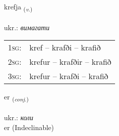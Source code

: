 \documentclass[frontgrid, backgrid]{flacards}\usepackage[]{graphicx}\usepackage[]{xcolor}
\begin{document}
\renewcommand{\flhead}{\vskip5pt \fboxsep=0pt {\small\bfseries\footnotesize Sagnorð | дієслово}}
\renewcommand{\fcfoot}{\vskip5pt \fboxsep=0pt \hspace{2pt}{\small\bfseries\footnotesize 1K}}

\renewcommand{\blhead}{\vskip5pt {\small\bfseries\footnotesize Sagnorð | дієслово }}
\renewcommand{\bcfoot}{\vskip5pt \hspace{2pt}{\small\bfseries\footnotesize 1K}}


{krefja \small{\textsubscript{(\textit{v.})}} \\[1ex] %
\textphonetic{[kʰrɛvja]} \\
ukr.: \emph{вимагати} \\  [2ex]
\renewcommand*{\arraystretch}{0.8}
\begin{tabular}{p{1cm}l}
\textsc{1sg}: & kref -- krafði -- krafið \\ 
\textsc{2sg}: & krefur -- krafðir -- krafið \\ 
\textsc{3sg}: & krefur -- krafði -- krafið \\ 
\end{tabular}
}


\renewcommand{\flhead}{\vskip5pt \fboxsep=0pt {\small\bfseries\footnotesize Samtenging | сполучник}}
\renewcommand{\fcfoot}{\vskip5pt \fboxsep=0pt \hspace{2pt}{\small\bfseries\footnotesize 1K}}

\renewcommand{\blhead}{\vskip5pt {\small\bfseries\footnotesize Samtenging | сполучник }}
\renewcommand{\bcfoot}{\vskip5pt \hspace{2pt}{\small\bfseries\footnotesize 1K}}


{er \small{\textsubscript{(\textit{conj.})}} \\[1ex]
\textphonetic{[ɛr]} \\
ukr.: \emph{коли} \\  [2ex]
er (Indeclinable)}

\end{document}
